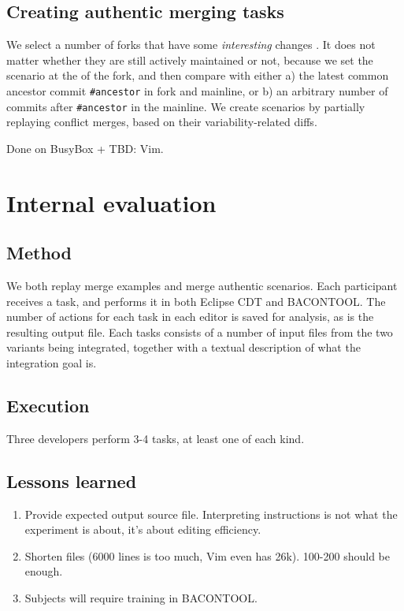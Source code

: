 \subsection{Creating authentic merging tasks}
We select a number of forks that have some \textit{interesting} changes \cite{stanciulescu2015}. It does not matter whether they are still actively maintained or not, because we set the scenario at the \head of the fork, and then compare with either a) the latest common ancestor commit \texttt{\#ancestor} in fork and mainline, or b) an arbitrary number of commits after \texttt{\#ancestor} in the mainline. We create scenarios by partially replaying conflict merges, based on their variability-related diffs.

Done on BusyBox + TBD: Vim.

\section{Internal evaluation}
\subsection{Method}
We both replay merge examples and merge authentic scenarios. Each participant receives a task, and performs it in both Eclipse CDT and BACONTOOL. The number of actions for each task in each editor is saved for analysis, as is the resulting output file. Each tasks consists of a number of input files from the two variants being integrated, together with a textual description of what the integration goal is.

\subsection{Execution}
Three developers perform 3-4 tasks, at least one of each kind.

\subsection{Lessons learned}
\begin{enumerate}
    \item Provide expected output source file. Interpreting instructions is not what the experiment is about, it's about editing efficiency.
    \item Shorten files (6000 lines is too much, Vim even has 26k). 100-200 should be enough.
    \item Subjects will require training in BACONTOOL.
\end{enumerate}

